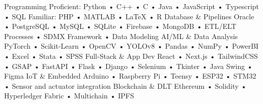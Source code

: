 

\begin{cvskills}

  \vspace{-0.8mm}
  \cvskill
    {Programming} %
    {Proficient:  Python • C++ • C • Java • JavaScript • Typescript • SQL \space\space\space Familiar: PHP • MATLAB • LaTeX • R}%
    \vspace{-0.8mm}
  \cvskill
    { Database \& Pipelines} %
    { Oracle • PostgreSQL • MySQL • SQLite • Firebase • MongoDB • ETL/ELT Processes • SDMX Framework • Data Modeling } %
    \vspace{-0.8mm}
  \cvskill
    { AI/ML \& Data Analysis } %
    { PyTorch • Scikit-Learn • OpenCV • YOLOv8 • Pandas • NumPy • PowerBI • Excel • Stata • SPSS } %
    \vspace{-0.8mm}
  \cvskill
    {Full-Stack \& App Dev} %
    { React • Next.js • TailwindCSS • GSAP • FastAPI • Flask • Django • Selenium • Tkinter • Java Swing • Figma }
    \vspace{-0.8mm}
  \cvskill
    { IoT \& Embedded} %
    {Arduino • Raspberry Pi • Teensy • ESP32 • STM32 • Sensor and actuator integration} %
    \vspace{-0.8mm}
  \cvskill
    {Blockchain \& DLT} %
    {Ethereum • Solidity • Hyperledger Fabric • Multichain • IPFS} %


\end{cvskills}

